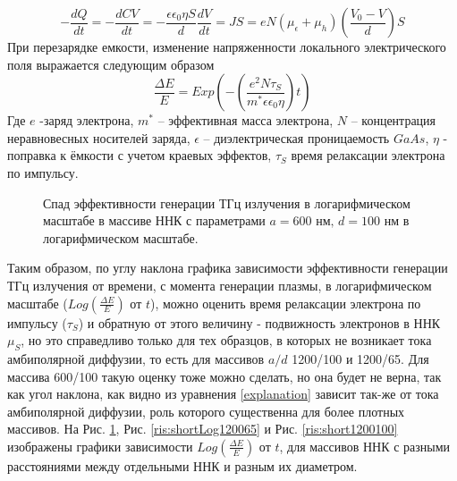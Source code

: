 \documentclass[a4paper,14pt,russian]{extreport}
\begin{document}
				\begin{equation}\label{explanation}
					-\frac{dQ}{dt} = - \frac{dCV}{dt} = - \frac{\epsilon \epsilon_0 \eta S}{d} \frac{dV}{dt} = JS = eN(\mu_{\epsilon}+\mu_{h})\left(\frac{V_0-V}{d}\right)S
				\end{equation}
				При перезарядке емкости, изменение напряженности локального электрического поля выражается следующим образом 
				\begin{equation}\label{Effectivity}
					\frac{\Delta E}{E} = Exp\left(-\left(\frac{e^2N\tau_S}{m^*\epsilon \epsilon_0 \eta}\right)t\right)
				\end{equation}
				Где $e$ -заряд электрона, $m^*$ – эффективная масса электрона, $N$ – концентрация неравновесных носителей заряда, $\epsilon$ – диэлектрическая проницаемость $GaAs$, $\eta$ - поправка к ёмкости с учетом краевых эффектов, $\tau_S$ время релаксации электрона по импульсу.\par
				\begin{figure}[H]
					\caption{Спад эффективности генерации ТГц излучения в логарифмическом масштабе в массиве ННК с параметрами $a = 600 \text{ нм, } d = 100 \text{ нм}$ в логарифмическом масштабе.}
				\label{ris:shortLog600100}
				\end{figure}
				Таким образом, по углу наклона графика зависимости эффективности генерации ТГц излучения от времени, с момента генерации плазмы, в логарифмическом масштабе ($Log\left(\frac{\Delta E}{E}\right)$ от $t$), можно оценить время релаксации электрона по импульсу ($\tau_S$) и обратную от этого величину - подвижность электронов в ННК $\mu_S$, но это справедливо только для тех образцов, в которых не возникает тока амбиполярной диффузии, то есть для массивов $a/d$ 1200/100 и 1200/65. Для массива 600/100 такую оценку тоже можно сделать, но она будет не верна, так как угол наклона, как видно из уравнения \ref{explanation} зависит так-же от тока амбиполярной диффузии, роль которого существенна для более плотных массивов. На Рис.  \ref{ris:shortLog600100}, Рис. \ref{ris:shortLog120065} и Рис. \ref{ris:short1200100} изображены графики зависимости $Log\left(\frac{\Delta E}{E}\right)$ от $t$, для массивов ННК с разными расстояниями между отдельными ННК и разным их диаметром.\par
\end{document}
